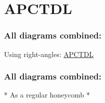 \documentclass[20pt]{beamer}
\begin{document}
\section{APCTDL}

\begin{frame}
\frametitle{All diagrams combined:}

Using right-angles:
\href{http://demog.berkeley.edu/~triffe/RGL1/}{APCTDL}

\end{frame}

\begin{frame}
\frametitle{All diagrams combined:}

* As a regular honeycomb *

\end{frame}
\end{document}
